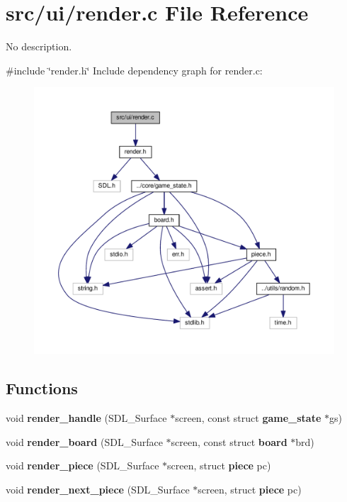 \section{src/ui/render.c File Reference}
\label{render_8c}


No description.  


{\ttfamily \#include \char`\"{}render.\+h\char`\"{}}\newline
Include dependency graph for render.\+c\+:
\nopagebreak
\begin{figure}[H]
\begin{center}
\leavevmode
\includegraphics[width=350pt]{render_8c__incl}
\end{center}
\end{figure}
\subsection*{Functions}
\begin{DoxyCompactItemize}
\item 
void \textbf{ render\+\_\+handle} (S\+D\+L\+\_\+\+Surface $\ast$screen, const struct \textbf{ game\+\_\+state} $\ast$gs)
\item 
void \textbf{ render\+\_\+board} (S\+D\+L\+\_\+\+Surface $\ast$screen, const struct \textbf{ board} $\ast$brd)
\item 
void \textbf{ render\+\_\+piece} (S\+D\+L\+\_\+\+Surface $\ast$screen, struct \textbf{ piece} pc)
\item 
void \textbf{ render\+\_\+next\+\_\+piece} (S\+D\+L\+\_\+\+Surface $\ast$screen, struct \textbf{ piece} pc)
\end{DoxyCompactItemize}


